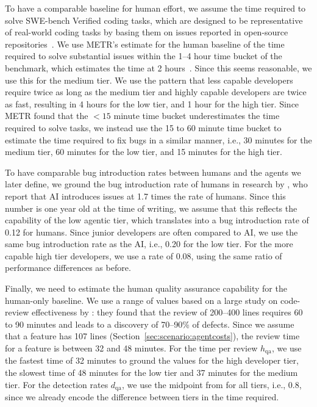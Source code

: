 \documentclass[smallextended]{svjour3}       %
\begin{document}
To have a comparable baseline for human effort, we assume the time required to solve SWE-bench Verified coding tasks, which are designed to be representative of real-world coding tasks by basing them on issues reported in open-source repositories~\citep{openai2026swebenchverified,jimenez2024swe}. We use METR's estimate for the human baseline of the time required to solve substantial issues within the 1--4 hour time bucket of the benchmark, which estimates the time at 2 hours~\citep{kwa2026measuringaiabilitycomplete}. Since this seems reasonable, we use this for the medium tier. We use the pattern that less capable developers require twice as long as the medium tier and highly capable developers are twice as fast, resulting in 4 hours for the low tier, and 1 hour for the high tier. Since METR found that the $<15$ minute time bucket underestimates the time required to solve tasks, we instead use the 15 to 60 minute time bucket to estimate the time required to fix bugs in a similar manner, i.e., 30 minutes for the medium tier, 60 minutes for the low tier, and 15 minutes for the high tier.

To have comparable bug introduction rates between humans and the agents we later define, we ground the bug introduction rate of humans in research by \cite{coderabbit2025aicode}, who report that AI introduces issues at 1.7 times the rate of humans. Since this number is one year old at the time of writing, we assume that this reflects the capability of the low agentic tier, which translates into a bug introduction rate of 0.12 for humans. Since junior developers are often compared to AI, we use the same bug introduction rate as the AI, i.e., 0.20 for the low tier. For the more capable high tier developers, we use a rate of 0.08, using the same ratio of performance differences as before. 

Finally, we need to estimate the human quality assurance capability for the human-only baseline. We use a range of values based on a large study on code-review effectiveness by \cite{cohen2006best}: they found that the review of 200--400 lines requires 60 to 90 minutes and leads to a discovery of 70--90\% of defects. Since we assume that a feature has 107 lines (Section~\ref{sec:scenario:agentcosts}), the review time for a feature is between 32 and 48 minutes. For the time per review $h_\mathrm{qa}$, we use the fastest time of 32 minutes to ground the values for the high developer tier, the slowest time of 48 minutes for the low tier and 37 minutes for the medium tier. For the detection rates $d_\mathrm{qa}$, we use the midpoint from \cite{cohen2006best} for all tiers, i.e., 0.8, since we already encode the difference between tiers in the time required. 
\end{document}
